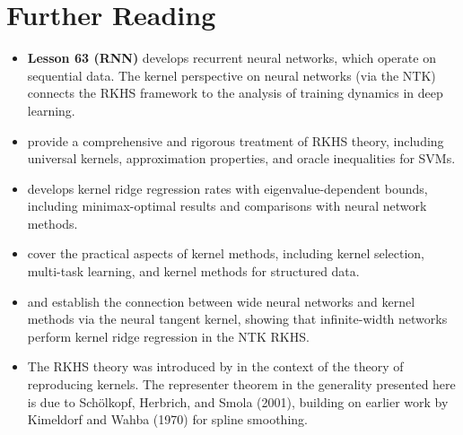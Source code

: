 \documentclass[11pt,a4paper]{article}
\begin{document}

\section{Further Reading}
\label{sec:further-reading}

\begin{itemize}
    \item \textbf{Lesson 63 (RNN)} develops recurrent neural
    networks, which operate on sequential data. The kernel
    perspective on neural networks (via the NTK) connects the RKHS
    framework to the analysis of training dynamics in deep learning.

    \item \citet{steinwart2008} provide a comprehensive and rigorous
    treatment of RKHS theory, including universal kernels,
    approximation properties, and oracle inequalities for SVMs.

    \item \citet{bach2024} develops kernel ridge regression rates
    with eigenvalue-dependent bounds, including minimax-optimal
    results and comparisons with neural network methods.

    \item \citet{scholkopf2002} cover the practical aspects of
    kernel methods, including kernel selection, multi-task learning,
    and kernel methods for structured data.

    \item \citet{jacot2018} and \citet{lee2019} establish the
    connection between wide neural networks and kernel methods via
    the neural tangent kernel, showing that infinite-width networks
    perform kernel ridge regression in the NTK RKHS.

    \item The RKHS theory was introduced by \citet{aronszajn1950}
    in the context of the theory of reproducing kernels. The
    representer theorem in the generality presented here is due to
    Sch\"olkopf, Herbrich, and Smola (2001), building on earlier
    work by Kimeldorf and Wahba (1970) for spline smoothing.
\end{itemize}


\end{document}
